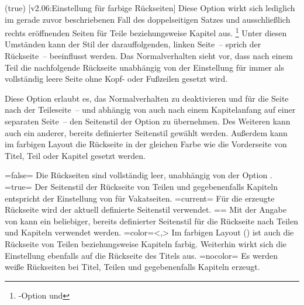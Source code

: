 \begin{DeclareEntity*}{}
\begin{DeclareEntity*}{}
\begin{DeclareEntity*}{}
\begin{Declaration}
  {}
  (true)
  [v2.06:Einstellung für farbige Rückseiten]
Diese Option wirkt sich lediglich im gerade zuvor beschriebenen Fall des 
doppelseitigen Satzes und ausschließlich rechts eröffnenden Seiten für Teile 
beziehungsweise Kapitel aus.%
\footnote{%
  \KOMAScript-Option  und %
}
Unter diesen Umständen kann der Stil der darauffolgenden, linken Seite~-- 
sprich der Rückseite~-- beeinflusst werden. Das Normalverhalten sieht vor, dass 
nach einem Teil die nachfolgende Rückseite unabhängig von der Einstellung für 
 immer als vollständig leere Seite ohne Kopf- oder 
Fußzeilen gesetzt wird.

Diese Option erlaubt es, das Normalverhalten zu deaktivieren und für die Seite 
nach der Teileseite~-- und abhängig von  auch nach einem 
Kapitelanfang auf einer separaten Seite~-- den Seitenstil der Option 
 zu übernehmen. Des Weiteren kann auch ein anderer, 
bereits definierter Seitenstil gewählt werden. Außerdem kann im farbigen Layout 
die Rückseite in der gleichen Farbe wie die Vorderseite von Titel, Teil oder 
Kapitel gesetzt werden. \notudscrartcl
\begin{DeclareValues}
\itemval=false=
  Die Rückseiten sind vollständig leer, unabhängig von der Option
  .
\itemval*=true=
  Der Seitenstil der Rückseite von Teilen und gegebenenfalls Kapiteln entspricht
  der Einstellung von  für Vakatseiten.
\itemval=current=
  Für die erzeugte Rückseite wird der aktuell definierte Seitenstil verwendet.
\itemval==
  Mit der Angabe von  
  kann ein beliebiger, bereits definierter Seitenstil für die Rückseite nach 
  Teilen und Kapiteln verwendet werden.
\itemval=color=<,>
  Im farbigen Layout () ist auch die 
  Rückseite von Teilen beziehungsweise Kapiteln farbig. Weiterhin wirkt sich 
  die Einstellung ebenfalls auf die Rückseite des Titels aus.
\itemval=nocolor=
  Es werden weiße Rückseiten bei Titel, Teilen und gegebenenfalls Kapiteln 
  erzeugt.
\end{DeclareValues}
%
\end{Declaration}




\end{DeclareEntity*}
\end{DeclareEntity*}
\end{DeclareEntity*}
